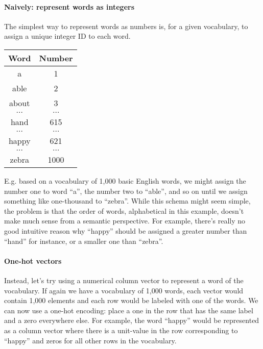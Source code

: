 \documentclass[12pt]{article}
\begin{document}
\paragraph{Naively: represent words as integers}
The simplest way to represent words as numbers is, for a given vocabulary, to assign a unique integer ID to each word.
\begin{table}[h]
  \begin{center}
    \begin{tabular}{c c}
      \hline
      Word & Number \\
      \hline
      a & 1 \\
      able & 2 \\
      about & 3 \\
      $\ldots$ & $\ldots$ \\
      hand & 615 \\
      $\ldots$ & $\ldots$ \\      
      happy & 621 \\
      $\ldots$ & $\ldots$ \\
      zebra & 1000 \\
      \hline
    \end{tabular}
  \end{center}
\end{table}
E.g. based on a vocabulary of 1,000 basic English words, we might assign the number one to word ``a'', the number two to ``able'', and so on until we assign something like one-thousand to ``zebra''. While this schema might seem simple, the problem is that the order of words, alphabetical in this example, doesn't make much sense from a semantic perspective. For example, there's really no good intuitive reason why ``happy'' should be assigned a greater number than ``hand'' for instance, or a smaller one than ``zebra''.

\paragraph{One-hot vectors} Instead, let's try using a numerical column vector to represent a word of the vocabulary. If again we have a vocabulary of 1,000 words, each vector would contain 1,000 elements and each row would be labeled with one of the words. We can now use a one-hot encoding: place a one in the row that has the same label and a zero everywhere else. For example, the word ``happy'' would be represented as a column vector where there is a unit-value in the row corresponding to ``happy'' and zeros for all other rows in the vocabulary.
\end{document}
